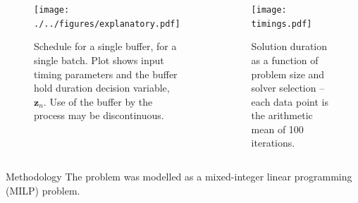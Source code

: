 \documentclass[final]{beamer}
\begin{document}
\begin{frame}[t]
        \begin{columns}
                \begin{figure}
                    \texttt{[image: ./../figures/explanatory.pdf]}
                    \caption{\Large \centering Schedule for a single buffer,
                        for a single batch.
                        Plot shows input timing parameters and the buffer hold
                        duration decision variable, $\boldsymbol{z}_n$.
                        Use of the buffer by the process may be discontinuous.}
                \end{figure}
                \begin{figure}
                    \texttt{[image: timings.pdf]}
                    \caption{\Large \centering Solution duration as a function
                        of problem size and solver selection -- each data point
                        is the arithmetic mean of 100 iterations.}
                \end{figure}
         \end{columns}
         \begin{columns}[t]
                \begin{block}{\huge Methodology}
                    The problem was modelled as a mixed-integer linear
                    programming (MILP) problem.

\end{block}
\end{columns}
\end{frame}
\end{document}
